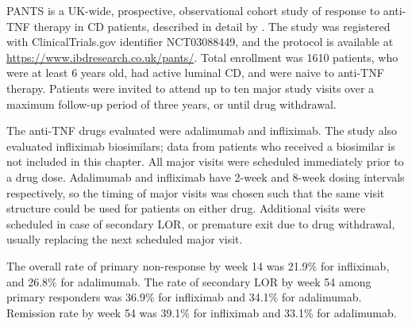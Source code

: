 \gls{PANTS} is a UK-wide, prospective, observational cohort study of response to anti-\gls{TNF} therapy in \gls{CD} patients, described in detail by \textcite{kennedy2019PredictorsAntiTNFTreatment}.
The study was registered with ClinicalTrials.gov identifier NCT03088449, and the protocol is available at \url{https://www.ibdresearch.co.uk/pants/}.
Total enrollment was 1610 patients, who were at least 6 years old, had active luminal \gls{CD}, and were naive to anti-\gls{TNF} therapy.
Patients were invited to attend up to ten major study visits over a maximum follow-up period of three years, or until drug withdrawal.

The anti-\gls{TNF} drugs evaluated were adalimumab and infliximab.
The study also evaluated infliximab biosimilars; data from patients who received a biosimilar is not included in this chapter.
All major visits were scheduled immediately prior to a drug dose.
Adalimumab and infliximab have 2-week and 8-week dosing intervals respectively, so the timing of major visits was chosen such that the same visit structure could be used for patients on either drug.
Additional visits were scheduled in case of secondary \gls{LOR}, or premature exit due to drug withdrawal, usually replacing the next scheduled major visit.

The overall rate of primary non-response by week 14 was 21.9\% for infliximab, and 26.8\% for adalimumab.
The rate of secondary \gls{LOR} by week 54 among primary responders was 36.9\% for infliximab and 34.1\% for adalimumab.
Remission rate by week 54 was 39.1\% for infliximab and 33.1\% for adalimumab.


